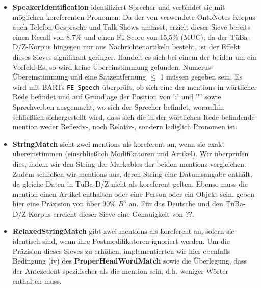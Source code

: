 \documentclass{scrartcl}
\begin{document}
\begin{itemize}

\item \textbf{SpeakerIdentification} identifiziert Sprecher und verbindet sie mit möglichen koreferenten Pronomen. Da der von  verwendete OntoNotes-Korpus auch Telefon-Gespräche und Talk Shows umfasst, erzielt dieser Sieve bereits einen Recall von 8,7\% und einen F1-Score von 15,5\% (MUC); da der TüBa-D/Z-Korpus hingegen nur aus Nachrichtenartikeln besteht, ist der Effekt dieses Sieves signifikant geringer. Handelt es sich bei einem der beiden um ein Vorfeld-Es, so wird keine Übereinstimmung gefunden. Numerus-Übereinstimmung und eine Satzentfernung ${\leq}$ 1 müssen gegeben sein. Es wird mit BARTs \texttt{FE\_Speech} überprüft, ob sich eine der mentions in wörtlicher Rede befindet und auf Grundlage der Position von ':' und '"' sowie Sprechverben ausgemacht, wo sich der Sprecher befindet, woraufhin schließlich sichergestellt wird, dass sich die in der wörtlichen Rede befindende mention weder Reflexiv-, noch Relativ-, sondern lediglich Pronomen ist.

\item \textbf{StringMatch} sieht zwei mentions als koreferent an, wenn sie exakt übereinstimmen (einschließlich Modifikatoren und Artikel). Wir überprüfen dies, indem wir den String der Markables der beiden mentions vergleichen. Zudem schließen wir mentions aus, deren String eine Datumsangabe enthält, da gleiche Daten in TüBa-D/Z nicht als koreferent gelten. Ebenso muss die mention einen Artikel enthalten oder eine Person oder ein Objekt sein.  geben hier eine Präzision von über 90\% $B^3$ an. Für das Deutsche und den TüBa-D/Z-Korpus erreicht dieser Sieve eine Genauigkeit von ??.

\item \textbf{RelaxedStringMatch} gibt zwei mentions als koreferent an, sofern sie identisch sind, wenn ihre Postmodifikatoren ignoriert werden. Um die Präzision dieses Sieves zu erhöhen, implementierten wir hier ebenfalls Bedingung (iv) des \textbf{ProperHeadWordMatch} sowie die Überlegung, dass der Antezedent spezifischer als die mention sein, d.h. weniger Wörter enthalten muss.


\end{itemize}
\end{document}

